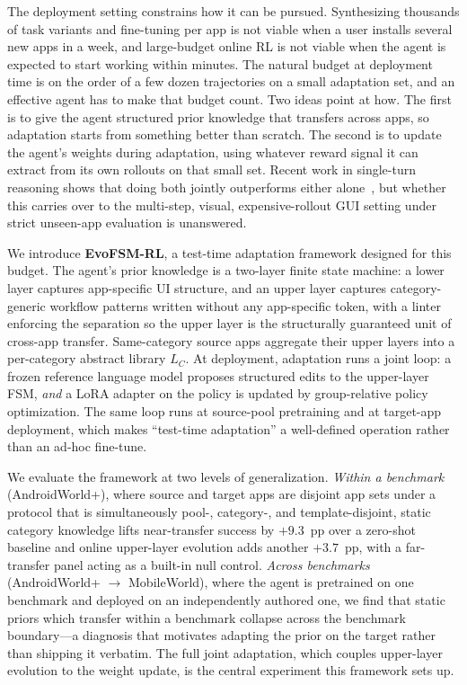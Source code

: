 The deployment setting constrains how it can be pursued. Synthesizing thousands
of task variants and fine-tuning per app is not viable when a user installs
several new apps in a week, and large-budget online RL is not viable when the
agent is expected to start working within minutes. The natural budget at
deployment time is on the order of a few dozen trajectories on a small
adaptation set, and an effective agent has to make that budget count. Two ideas
point at how. The first is to give the agent structured prior knowledge that
transfers across apps, so adaptation starts from something better than scratch.
The second is to update the agent's weights during adaptation, using whatever
reward signal it can extract from its own rollouts on that small set. Recent work
in single-turn reasoning shows that doing both jointly outperforms either
alone~\citep{zhang2026espl}, but whether this carries over to the multi-step,
visual, expensive-rollout GUI setting under strict unseen-app evaluation is
unanswered.

We introduce \textbf{EvoFSM-RL}, a test-time adaptation framework designed for
this budget. The agent's prior knowledge is a two-layer finite state machine: a
lower layer captures app-specific UI structure, and an upper layer captures
category-generic workflow patterns written without any app-specific token, with
a linter enforcing the separation so the upper layer is the structurally
guaranteed unit of cross-app transfer. Same-category source apps aggregate their
upper layers into a per-category abstract library $L_C$. At deployment,
adaptation runs a joint loop: a frozen reference language model proposes
structured edits to the upper-layer FSM, \emph{and} a LoRA adapter on the policy
is updated by group-relative policy optimization. The same loop runs at
source-pool pretraining and at target-app deployment, which makes ``test-time
adaptation'' a well-defined operation rather than an ad-hoc fine-tune.

We evaluate the framework at two levels of generalization. \emph{Within a
benchmark} (AndroidWorld+), where source and target apps are disjoint app sets
under a protocol that is simultaneously pool-, category-, and template-disjoint,
static category knowledge lifts near-transfer success by $+9.3$~pp over a
zero-shot baseline and online upper-layer evolution adds another $+3.7$~pp, with
a far-transfer panel acting as a built-in null control. \emph{Across benchmarks}
(AndroidWorld+ $\to$ MobileWorld), where the agent is pretrained on one
benchmark and deployed on an independently authored one, we find that static
priors which transfer within a benchmark collapse across the benchmark
boundary---a diagnosis that motivates adapting the prior on the target rather
than shipping it verbatim. The full joint adaptation, which couples upper-layer
evolution to the weight update, is the central experiment this framework sets
up.

